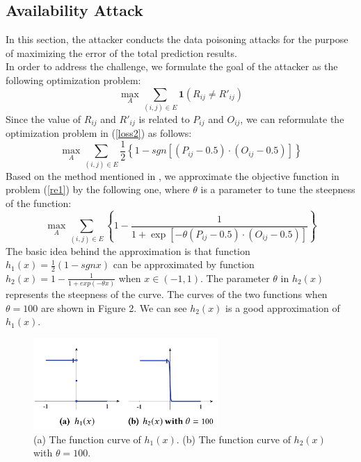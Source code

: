 \documentclass{acmtog} %
\begin{document}
\subsection{Availability Attack}
In this section, the attacker conducts the data poisoning attacks
for the purpose of maximizing the error of the total prediction results.\\
\indent In order to address the challenge, we formulate the goal
of the attacker as the following optimization problem:
\begin{equation}
\max _ { A } \sum _ { (i,j)\in E } \mathbf { 1 } \left( R _ { ij }  \neq R' _ { ij } \right)\label{loss2}
\end{equation}
Since the value of $R_{ij}$ and $R'_{ij}$ is related to $P_{ij}$ and $O_{ij}$, we can reformulate the optimization problem in (\ref{loss2}) as follows:
\begin{equation}
\max _ { A } \sum _ { (i,j) \in E } \frac { 1 } { 2 } \left\{ 1 -  { sgn } \left[ \left( P_{ij} - 0.5 \right) \cdot \left( O_{ij} - 0.5 \right) \right] \right\}\label{re1}
\end{equation}
Based on the method mentioned in \cite{Attack}, we approximate the objective function in
problem (\ref{re1}) by the following one, where  $\theta$ is a parameter to tune the steepness of the function:
\begin{equation}
\max _ { A } \sum _ { (i,j)\in E }  \left\{ 1 - \frac { 1 } { 1 + \exp \left[ - \theta \left( P _ { ij } - 0.5 \right) \cdot \left(  O_{ij} - 0.5 \right) \right] } \right\}
\end{equation}
The basic idea behind the approximation is that function $h_1(x) =
\frac{1}{2}
(1-sgnx)$ can be approximated by function $h_2(x) = 1-\frac{1}{1+exp(-\theta x )}$
when $x \in (-1, 1)$. The parameter $\theta$ in $h_2(x)$ represents the steepness of the curve. The curves of the two functions when $\theta = 100$ are shown in Figure 2. We can see $h_2(x)$ is a good approximation of $h_1(x)$.\\ 
\begin{figure}[t]	\centerline{\includegraphics[width=7cm]{2.png}}
	\caption{(a) The function curve of $h_1(x)$. (b) The function curve of $h_2(x)$ with $\theta=100$.}
	\label{fig:Longtin_v_Moon_right_and_comparison}
\end{figure}
\end{document}

